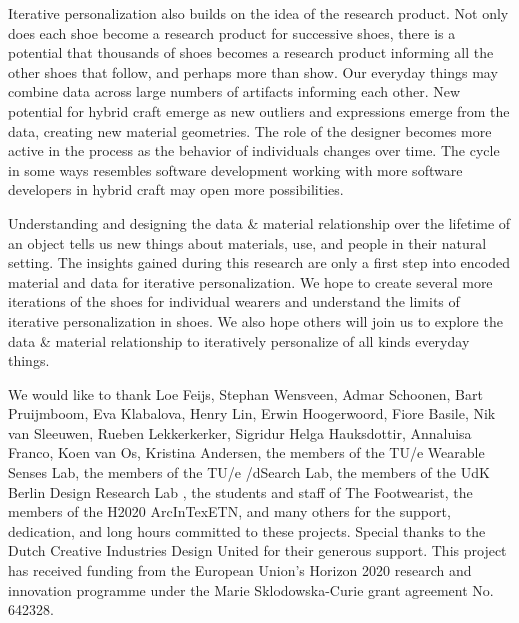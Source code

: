 Iterative personalization also builds on the idea of the research product\cite{Odom2016}. Not only does each shoe become a research product for successive shoes, there is a potential that thousands of shoes becomes a research product informing all the other shoes that follow, and perhaps more than show. Our everyday things may combine data across large numbers of artifacts informing each other. New potential for hybrid craft emerge as new outliers and expressions emerge from the data, creating new material geometries. The role of the designer becomes more active in the process as the behavior of individuals changes over time. The cycle in some ways resembles software development working with more software developers in hybrid craft may open more possibilities. 

Understanding and designing the data \& material relationship over the lifetime of an object tells us new things about materials, use, and people in their natural setting. 
The insights gained during this research are only a first step into encoded material and data for iterative personalization. We hope to create several more iterations of the shoes for individual wearers and understand the limits of iterative personalization in shoes. We also hope others will join us to explore the data \& material relationship to iteratively personalize of all kinds everyday things.  


\begin{acks}
We would like to thank Loe Feijs, Stephan Wensveen, Admar Schoonen, Bart Pruijmboom, Eva Klabalova, Henry Lin, Erwin Hoogerwoord, Fiore Basile, Nik van Sleeuwen, Rueben Lekkerkerker, Sigridur Helga Hauksdottir, Annaluisa Franco, Koen van Os, Kristina Andersen, the members of the TU/e Wearable Senses Lab, the members of the TU/e /dSearch Lab, the members of the UdK Berlin Design Research Lab , the students and staff of The Footwearist, the members of the H2020 ArcInTexETN, and many others for the support, dedication, and long hours committed to these projects. Special thanks to the Dutch Creative Industries Design United for their generous support. This project has received funding from the European Union's Horizon 2020 research and innovation programme under the Marie Sklodowska-Curie grant agreement No. 642328.
\end{acks}
